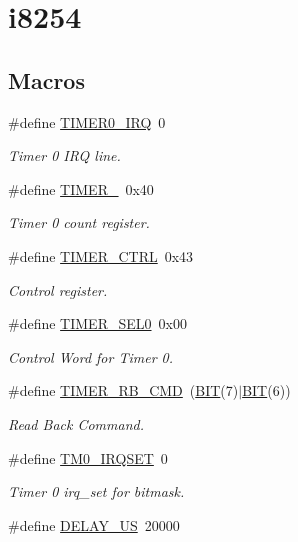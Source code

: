\hypertarget{group__i8254}{}\section{i8254}
\label{group__i8254}
\subsection*{Macros}
\begin{DoxyCompactItemize}
\item 
\#define \hyperlink{group__i8254_ga30bf84c312af248cb81bb224e09f9ba8}{T\+I\+M\+E\+R0\+\_\+\+I\+RQ}~0
\begin{DoxyCompactList}\small\item\em Timer 0 I\+RQ line. \end{DoxyCompactList}\item 
\#define \hyperlink{group__i8254_gacc9ff9df4a9674a1ce9ba08fc4a4679e}{T\+I\+M\+E\+R\+\_}~0x40
\begin{DoxyCompactList}\small\item\em Timer 0 count register. \end{DoxyCompactList}\item 
\#define \hyperlink{group__i8254_ga282832448fb0281ef53d243c1cd48491}{T\+I\+M\+E\+R\+\_\+\+C\+T\+RL}~0x43
\begin{DoxyCompactList}\small\item\em Control register. \end{DoxyCompactList}\item 
\#define \hyperlink{group__i8254_ga6a4822642d40c248435692324a818010}{T\+I\+M\+E\+R\+\_\+\+S\+E\+L0}~0x00
\begin{DoxyCompactList}\small\item\em Control Word for Timer 0. \end{DoxyCompactList}\item 
\#define \hyperlink{group__i8254_ga4c2eecbfb96744a9c2af71dba75ecb18}{T\+I\+M\+E\+R\+\_\+\+R\+B\+\_\+\+C\+MD}~(\hyperlink{tools_8h_a3a8ea58898cb58fc96013383d39f482c}{B\+IT}(7)$\vert$\hyperlink{tools_8h_a3a8ea58898cb58fc96013383d39f482c}{B\+IT}(6))
\begin{DoxyCompactList}\small\item\em Read Back Command. \end{DoxyCompactList}\item 
\#define \hyperlink{group__i8254_gaa8b3f7a4eeaccbeb4e42a2ca6a9d0cd8}{T\+M0\+\_\+\+I\+R\+Q\+S\+ET}~0
\begin{DoxyCompactList}\small\item\em Timer 0 irq\+\_\+set for bitmask. \end{DoxyCompactList}\item 
\#define \hyperlink{group__i8254_ga1a522aa19bcb695a9df30032a893bee3}{D\+E\+L\+A\+Y\+\_\+\+US}~20000
\end{DoxyCompactItemize}


